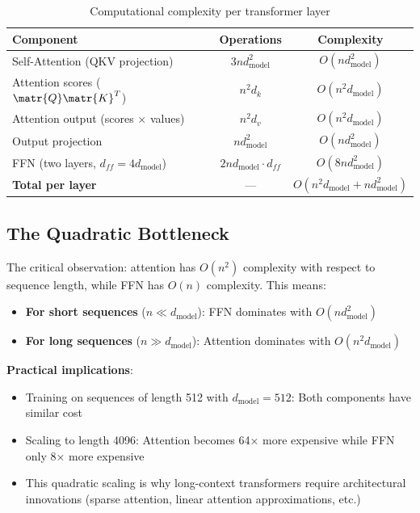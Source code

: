 \begin{table}[h!]
  \centering
  \caption{Computational complexity per transformer layer}
  \begin{tabular}{lcc}
    \toprule
    \textbf{Component} & \textbf{Operations} & \textbf{Complexity} \\
    \midrule
    Self-Attention (QKV projection) & $3nd_{\text{model}}^2$ & $O(nd_{\text{model}}^2)$ \\
    Attention scores ($\matr{Q}\matr{K}^T$) & $n^2d_k$ & $O(n^2d_{\text{model}})$ \\
    Attention output (scores $\times$ values) & $n^2d_v$ & $O(n^2d_{\text{model}})$ \\
    Output projection & $nd_{\text{model}}^2$ & $O(nd_{\text{model}}^2)$ \\
    FFN (two layers, $d_{ff} = 4d_{\text{model}}$) & $2nd_{\text{model}} \cdot d_{ff}$ & $O(8nd_{\text{model}}^2)$ \\
    \midrule
    \textbf{Total per layer} & --- & $O(n^2d_{\text{model}} + nd_{\text{model}}^2)$ \\
    \bottomrule
  \end{tabular}
\end{table}

\subsection{The Quadratic Bottleneck}

The critical observation: attention has $O(n^2)$ complexity with respect to sequence length, while FFN has $O(n)$ complexity. This means:

\begin{itemize}
  \item \textbf{For short sequences} ($n \ll d_{\text{model}}$): FFN dominates with $O(nd_{\text{model}}^2)$
  \item \textbf{For long sequences} ($n \gg d_{\text{model}}$): Attention dominates with $O(n^2d_{\text{model}})$
\end{itemize}

\textbf{Practical implications}:
\begin{itemize}
  \item Training on sequences of length 512 with $d_{\text{model}}=512$: Both components have similar cost
  \item Scaling to length 4096: Attention becomes 64× more expensive while FFN only 8× more expensive
  \item This quadratic scaling is why long-context transformers require architectural innovations (sparse attention, linear attention approximations, etc.)
\end{itemize}

